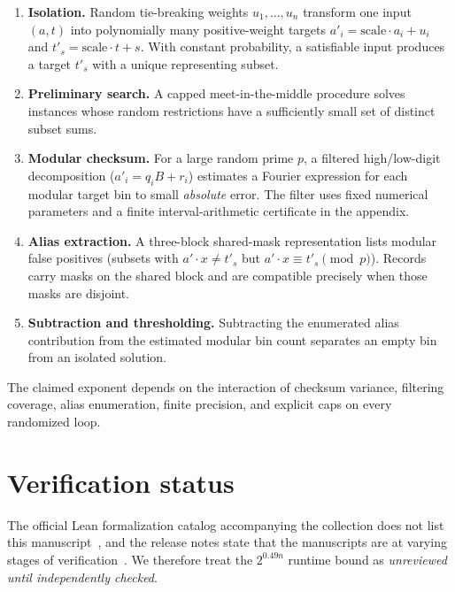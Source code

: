 \documentclass[11pt]{article}
\begin{document}
\begin{enumerate}
\item \textbf{Isolation.} Random tie-breaking weights $u_1,\dots,u_n$ transform
  one input $(a,t)$ into polynomially many positive-weight targets
  $a'_i = \text{scale}\cdot a_i + u_i$ and $t'_s = \text{scale}\cdot t + s$.
  With constant probability, a satisfiable input produces a target $t'_s$ with
  a unique representing subset.
\item \textbf{Preliminary search.} A capped meet-in-the-middle procedure solves
  instances whose random restrictions have a sufficiently small set of distinct
  subset sums.
\item \textbf{Modular checksum.} For a large random prime $p$, a filtered
  high/low-digit decomposition ($a'_i = q_i B + r_i$) estimates a Fourier
  expression for each modular target bin to small \emph{absolute} error. The
  filter uses fixed numerical parameters and a finite interval-arithmetic
  certificate in the appendix.
\item \textbf{Alias extraction.} A three-block shared-mask representation lists
  modular false positives (subsets with $a'\cdot x \neq t'_s$ but
  $a'\cdot x \equiv t'_s \pmod p$). Records carry masks on the shared block and
  are compatible precisely when those masks are disjoint.
\item \textbf{Subtraction and thresholding.} Subtracting the enumerated alias
  contribution from the estimated modular bin count separates an empty bin from
  an isolated solution.
\end{enumerate}

The claimed exponent depends on the interaction of checksum variance, filtering
coverage, alias enumeration, finite precision, and explicit caps on every
randomized loop.

\section{Verification status}

The official Lean formalization catalog accompanying the collection does not
list this manuscript~\cite{openai-lean}, and the release notes state that the
manuscripts are at varying stages of verification~\cite{openai-release}. We
therefore treat the $2^{0.49n}$ runtime bound as \emph{unreviewed until
independently checked}.
\end{document}

